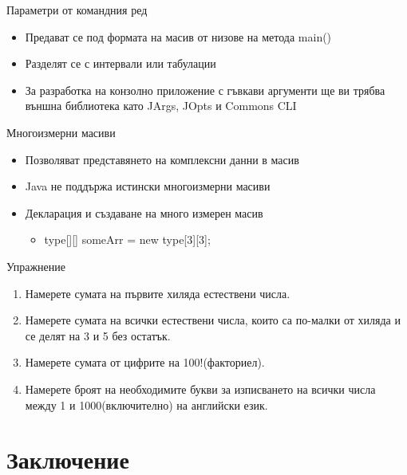 \documentclass{beamer}
\begin{document}
\begin{frame}{Параметри от командния ред}
  \transdissolve
  \begin{itemize}
  \item Предават се под формата на масив от низове на метода main()
  \item Разделят се с интервали или табулации
  \item За разработка на конзолно приложение с гъвкави аргументи ще ви
    трябва външна библиотека като JArgs, JOpts и Commons CLI
  \end{itemize}
\end{frame}

\begin{frame}{Многоизмерни масиви}
  \transdissolve
  \begin{itemize}
  \item Позволяват представянето на комплексни данни в масив
  \item Java не поддържа истински многоизмерни масиви
  \item Декларация и създаване на много измерен масив
    \begin{itemize}
      \item type[][] someArr = new type[3][3];
    \end{itemize}
  \end{itemize}
\end{frame}

\begin{frame}{Упражнение}
  \transdissolve  
  \begin{enumerate}
    \item Намерете сумата на първите хиляда естествени числа. \pause
    \item Намерете сумата на всички естествени числа, които са
      по-малки от хиляда и се делят на 3 и 5 без остатък. \pause
    \item Намерете сумата от цифрите на 100!(факториел). \pause
    \item Намерете броят на необходимите букви за изписването на
      всички числа между 1 и 1000(включително) на английски език.
  \end{enumerate}

\end{frame}

\section*{Заключение}
\end{document}
